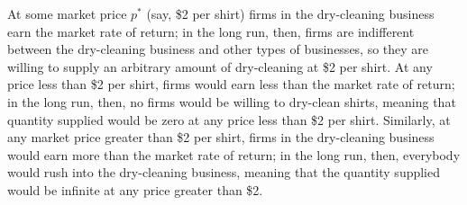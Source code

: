 \documentclass{article}
\begin{document}
\begin{enumerate}
\begin{KEY} At some market price $p^*$ (say, \$2 per shirt) firms in the dry-cleaning business earn the market rate of return; in the long run, then, firms are indifferent between the dry-cleaning business and other types of businesses, so they are willing to supply an arbitrary amount of dry-cleaning at \$2 per shirt. At any price less than \$2 per shirt, firms would earn less than the market rate of return; in the long run, then, no firms would be willing to dry-clean shirts, meaning that quantity supplied would be zero at any price less than \$2 per shirt. Similarly, at any market price greater than \$2 per shirt, firms in the dry-cleaning business would earn more than the market rate of return; in the long run, then, everybody would rush into the dry-cleaning business, meaning that the quantity supplied would be infinite at any price greater than \$2. \end{KEY}


\end{enumerate}
\end{document}
